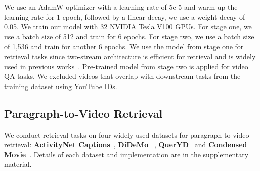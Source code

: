 \documentclass{article}
\begin{document}
We use an AdamW optimizer with a learning rate of 5e-5 and warm up the learning rate for 1 epoch, followed by a linear decay, we use a weight decay of 0.05. We train our model with 32 NVIDIA Tesla V100 GPUs. For stage one, we use a batch size of 512 and train for 6 epochs. For stage two, we use a batch size of 1,536 and train for another 6 epochs. We use the model from stage one for retrieval tasks since two-stream architecture is efficient for retrieval and is widely used in previous works~\cite{Alec2021CLIP,bain2021frozen,xue2021hdvila}. Pre-trained model from stage two is applied for video QA tasks. We excluded videos that overlap with downstream tasks from the training dataset using YouTube IDs.

\subsection{Paragraph-to-Video Retrieval}
We conduct retrieval tasks on four widely-used datasets for paragraph-to-video retrieval: \textbf{ActivityNet Captions}~\cite{krishna2017actnetcaption}, \textbf{DiDeMo}~\cite{anne2017didemo} , \textbf{QuerYD}~\cite{oncescu2021queryd} and \textbf{Condensed Movie}~\cite{bain2020cmovie}.
Details of each dataset and implementation are in the supplementary material.
\end{document}
